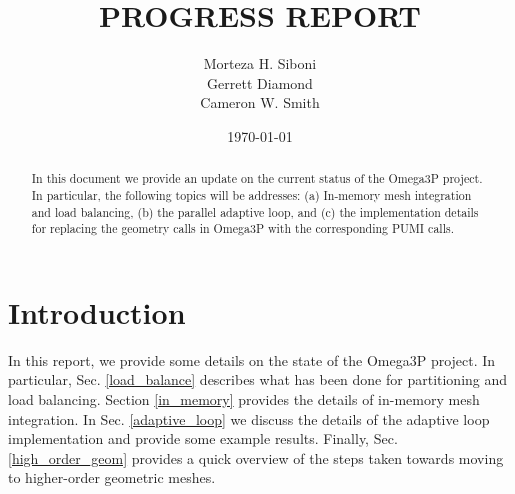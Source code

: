 \documentclass[review,12pt]{elsarticle_summary_report}
\begin{document}
\title{PROGRESS REPORT}%

\author[]{Morteza H. Siboni \\
Gerrett Diamond \\
Cameron W. Smith}



\date{\today}



\begin{abstract}
  In this document we provide an update on the current status of the Omega3P project. In particular, the following topics will be addresses: (a) In-memory mesh integration and load balancing, (b) the parallel adaptive loop, and (c) the implementation details for replacing the geometry calls in Omega3P  with the corresponding PUMI calls.
\end{abstract}


\maketitle




\section{Introduction}
In this report, we provide some details on the state of the Omega3P project. In particular, Sec. \ref{load_balance} describes what has been done for partitioning and load balancing. Section \ref{in_memory} provides the details of in-memory mesh integration. In Sec. \ref{adaptive_loop} we discuss the details of the adaptive loop implementation and provide some example results. Finally, Sec. \ref{high_order_geom} provides a quick overview of the steps taken towards moving to higher-order geometric meshes.
\end{document}
